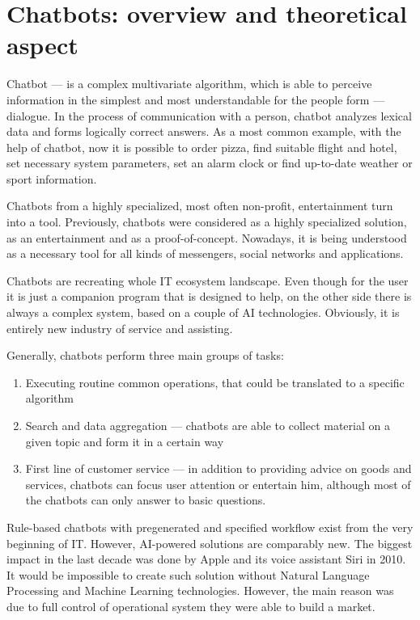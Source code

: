 
\section{Chatbots: overview and theoretical aspect}

Chatbot — is a complex multivariate algorithm, which is able to perceive information in the simplest and most understandable for the people form — dialogue.
In the process of communication with a person, chatbot analyzes lexical data and forms logically correct answers.
As a most common example, with the help of chatbot, now it is possible to order pizza, find suitable flight and hotel, set necessary system parameters, set an alarm clock or find up-to-date weather or sport information.

Chatbots from a highly specialized, most often non-profit, entertainment turn into a tool.
Previously, chatbots were considered as a highly specialized solution, as an entertainment and as a proof-of-concept.
Nowadays, it is being understood as a necessary tool for all kinds of messengers, social networks and applications.

Chatbots are recreating whole IT ecosystem landscape.
Even though for the user it is just a companion program that is designed to help, on the other side there is always a complex system, based on a couple of AI technologies.
Obviously, it is entirely new industry of service and assisting.

Generally, chatbots perform three main groups of tasks:
\begin{enumerate}
    \item Executing routine common operations, that could be translated to a specific algorithm
    \item Search and data aggregation — chatbots are able to collect material on a given topic and form it in a certain way
    \item First line of customer service — in addition to providing advice on goods and services, chatbots can focus user attention or entertain him, although most of the chatbots can only answer to basic questions.
\end{enumerate}

Rule-based chatbots with pregenerated and specified workflow exist from the very beginning of IT.
However, AI-powered solutions are comparably new.
The biggest impact in the last decade was done by Apple and its voice assistant Siri in 2010.
It would be impossible to create such solution without Natural Language Processing and Machine Learning technologies.
However, the main reason was due to full control of operational system they were able to build a market.

